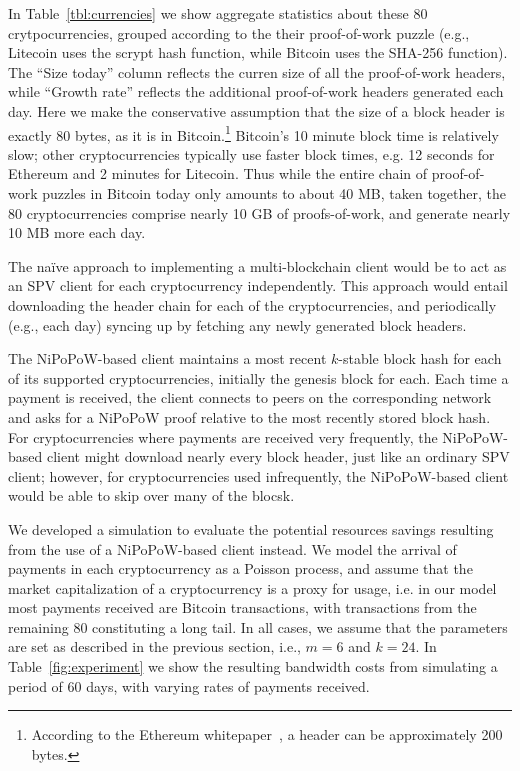 In Table~\ref{tbl:currencies} we show aggregate statistics about these 80 crytpocurrencies, grouped according to the their proof-of-work puzzle (e.g., Litecoin uses the scrypt hash function, while Bitcoin uses the SHA-256 function). The ``Size today'' column reflects the curren size of all the proof-of-work headers, while ``Growth rate'' reflects the additional proof-of-work headers generated each day. Here we make the conservative assumption that the size of a block header is exactly 80 bytes, as it is in Bitcoin.\footnote{According to the Ethereum whitepaper~\cite{ethereum}, a header can be approximately 200 bytes.}
 Bitcoin's 10 minute block time is relatively slow; other cryptocurrencies typically use faster block times, e.g. 12 seconds for Ethereum and 2 minutes for Litecoin. Thus while the entire chain of proof-of-work puzzles in Bitcoin today only amounts to about 40 MB, taken together, the 80 cryptocurrencies comprise nearly 10 GB of proofs-of-work, and generate nearly 10 MB more each day.

 The na\"ive approach to implementing a multi-blockchain client would be to act as an SPV client for each cryptocurrency independently. This approach would entail downloading the header chain for each of the cryptocurrencies, and periodically (e.g., each day) syncing up by fetching any newly generated block headers.

 The NiPoPoW-based client maintains a most recent $k$-stable block hash for each of its supported cryptocurrencies, initially the genesis block for each.
  Each time a payment is received, the client connects to peers on the corresponding network and asks for a NiPoPoW proof relative to the most recently stored block hash. For cryptocurrencies where payments are received very frequently, the NiPoPoW-based client might download nearly every block header, just like an ordinary SPV client; however, for cryptocurrencies used infrequently, the NiPoPoW-based client would be able to skip over many of the blocsk.

 We developed a simulation to evaluate the potential resources savings resulting from the use of a NiPoPoW-based client instead. 
 We model the arrival of payments in each cryptocurrency as a Poisson process, and assume that the market capitalization of a cryptocurrency is a proxy for usage, i.e. in our model most payments received are Bitcoin transactions, with transactions from the remaining 80 constituting a long tail. In all cases, we assume that the parameters are set as described in the previous section, i.e., $m=6$ and $k=24$.
 In Table~\ref{fig:experiment} we show the resulting bandwidth costs from simulating a period of 60 days, with varying rates of payments received.

